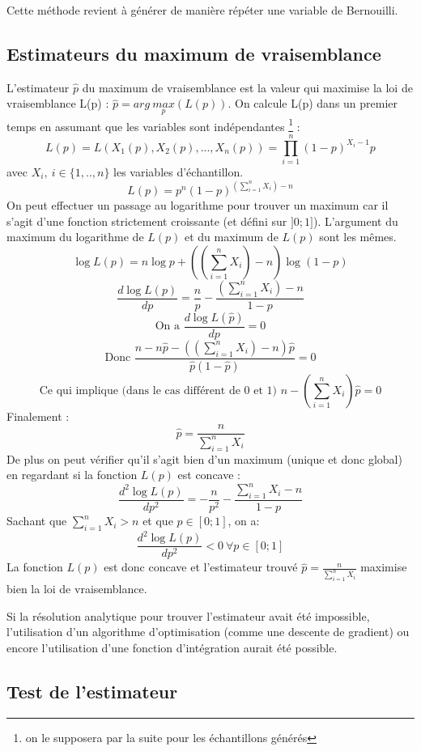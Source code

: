 \documentclass[12pt,a4paper,titlepage]{article}
\numberwithin{equation}{section}
\begin{document}


Cette méthode revient à générer de manière répéter
une variable de Bernouilli.


\subsection{Estimateurs du maximum de vraisemblance}

L'estimateur $\hat{p}$ du maximum de vraisemblance est la valeur qui
maximise la loi de vraisemblance L(p) : $\hat{p}=arg\ \underset{p}{max}(L(p))$.
On calcule L(p) dans un premier temps en assumant que les variables sont indépendantes \footnote{on le supposera par la suite pour les échantillons générés} :
\[L(p)=L(X_1(p),X_2(p),...,X_n(p))=\prod\limits_{i=1}^{n}(1-p)^{X_i-1}p 
\]
avec $X_i,\ i\in\{1,..,n\}$ les variables d'échantillon.
\[L(p)=p^n(1-p)^{(\sum\limits_{i=1}^{n}X_i)-n}\]
On peut effectuer un passage au logarithme pour trouver un maximum car il s'agit
d'une fonction strictement croissante (et défini sur $]0;1]$). L'argument du maximum du logarithme
de $L(p)$ et du maximum de $L(p)$ sont les mêmes.
\[\log{L(p)}=n\log{p}+((\sum\limits_{i=1}^{n}X_i)-n)\log{(1-p)}\]
\[\frac{d\log{L(p)}}{dp}=\frac{n}{p}-\frac{(\sum\limits_{i=1}^{n}X_i)-n}{1-p}\]
\[\text{On a }\frac{d\log{L(\hat{p})}}{dp}=0\]
\[\text{Donc }\frac{n-n\hat{p}-((\sum\limits_{i=1}^{n}X_i)-n)\hat{p}}{\hat{p}(1-\hat{p})}=0\]
\[\text{Ce qui implique (dans le cas différent de 0 et 1) }n-(\sum\limits_{i=1}^{n}X_i)\hat{p}=0\]
Finalement :
\[\hat{p} = \frac{n}{\sum\limits_{i=1}^{n}X_i}\]
De plus on peut vérifier qu'il s'agit bien d'un maximum (unique et donc global) en regardant si la fonction $L(p)$ est concave :
\[\frac{d^2\log{L(p)}}{dp^2} = -\frac{n}{p^2}-\frac{\sum\limits_{i=1}^{n}X_i-n}{1-p}\]
Sachant que $\sum\limits_{i=1}^{n}X_i > n $
et que $p\in[0;1]$, on a:
\[\frac{d^2 \log{L(p)}}{dp^2}<0 \ \forall p\in[0;1]\]
La fonction $L(p)$ est donc concave et l'estimateur trouvé $\hat{p} = \frac{n}{\sum\limits_{i=1}^{n}X_i}$ maximise bien la loi de vraisemblance.

Si la résolution analytique pour trouver l'estimateur avait été impossible,
l'utilisation d'un algorithme d'optimisation (comme une descente de gradient) ou encore
l'utilisation d'une fonction d'intégration aurait été possible.

\subsection{Test de l'estimateur}
\end{document}
